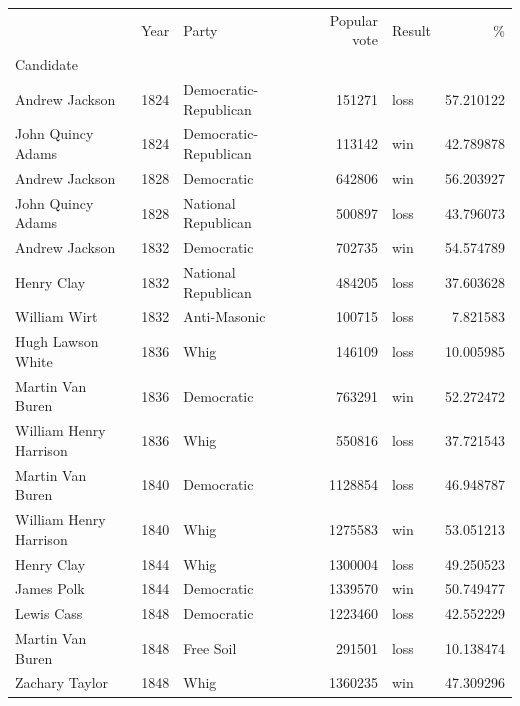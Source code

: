 \documentclass[
  letterpaper,
  DIV=11,
  numbers=noendperiod]{scrreprt}
\begin{document}
\begin{tabular}{lrlrlr}
\toprule
{} &  Year &                  Party &  Popular vote & Result &          \% \\
Candidate              &       &                        &               &        &            \\
\midrule
Andrew Jackson         &  1824 &  Democratic-Republican &        151271 &   loss &  57.210122 \\
John Quincy Adams      &  1824 &  Democratic-Republican &        113142 &    win &  42.789878 \\
Andrew Jackson         &  1828 &             Democratic &        642806 &    win &  56.203927 \\
John Quincy Adams      &  1828 &    National Republican &        500897 &   loss &  43.796073 \\
Andrew Jackson         &  1832 &             Democratic &        702735 &    win &  54.574789 \\
Henry Clay             &  1832 &    National Republican &        484205 &   loss &  37.603628 \\
William Wirt           &  1832 &           Anti-Masonic &        100715 &   loss &   7.821583 \\
Hugh Lawson White      &  1836 &                   Whig &        146109 &   loss &  10.005985 \\
Martin Van Buren       &  1836 &             Democratic &        763291 &    win &  52.272472 \\
William Henry Harrison &  1836 &                   Whig &        550816 &   loss &  37.721543 \\
Martin Van Buren       &  1840 &             Democratic &       1128854 &   loss &  46.948787 \\
William Henry Harrison &  1840 &                   Whig &       1275583 &    win &  53.051213 \\
Henry Clay             &  1844 &                   Whig &       1300004 &   loss &  49.250523 \\
James Polk             &  1844 &             Democratic &       1339570 &    win &  50.749477 \\
Lewis Cass             &  1848 &             Democratic &       1223460 &   loss &  42.552229 \\
Martin Van Buren       &  1848 &              Free Soil &        291501 &   loss &  10.138474 \\
Zachary Taylor         &  1848 &                   Whig &       1360235 &    win &  47.309296 \\

\end{tabular}
\end{document}
